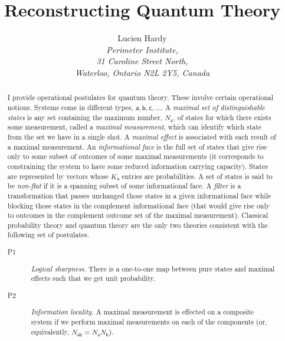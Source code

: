 \documentclass[10pt]{article}
\begin{document}
\title{\textbf{Reconstructing Quantum Theory}}
\author{Lucien Hardy\\
\textit{Perimeter Institute,}\\
\textit{31 Caroline Street North,}\\
\textit{Waterloo, Ontario N2L 2Y5, Canada}}
\date{}

\maketitle

\begin{abstract}
I provide operational postulates for quantum theory.  These involve certain operational notions.  Systems come in different types, $\mathsf{a, b, c, \dots}$.  A \emph{maximal set of distinguishable states} is any set containing the maximum number, $N_\mathsf{a}$, of states for which there exists some measurement, called a \emph{maximal measurement}, which can identify which state from the set we have in a single shot.  A \emph{maximal effect} is associated with each result of a maximal measurement.  An \emph{informational face} is the full set of states that give rise only to some subset of outcomes of some maximal measurements (it corresponds to constraining the system to have some reduced information carrying capacity). States are represented by vectors whose $K_\mathsf{a}$ entries are probabilities. A set of states is said to be \emph{non-flat} if it is a spanning subset of some informational face. A \emph{filter} is a transformation that passes unchanged those states in a given informational face while blocking those states in the complement informational face (that would give rise only to outcomes in the complement outcome set of the maximal measurement).
Classical probability theory and quantum theory are the only two theories consistent with the following set of postulates.
\begin{description}
\item[P1] \emph{Logical sharpness.} There is a one-to-one map between pure states and maximal effects such that we get unit probability.
\item[P2] \emph{Information locality.} A maximal measurement is effected on a composite system if we perform maximal measurements on each of the components (or, equivalently, $N_\mathsf{ab}=N_\mathsf{a}N_\mathsf{b}$). 

\end{description}
\end{abstract}
\end{document}
